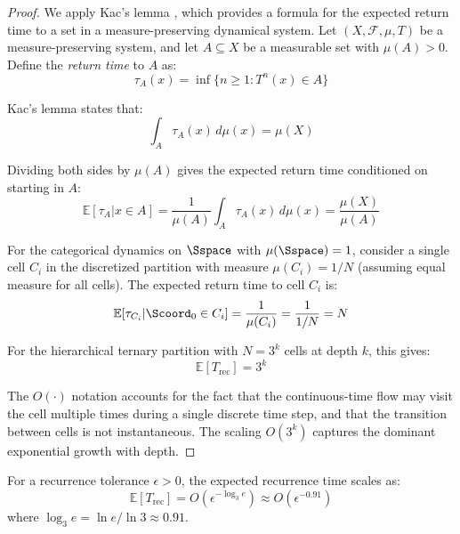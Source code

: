 \begin{proof}
We apply Kac's lemma \citep{kac1947notion}, which provides a formula for the expected return time to a set in a measure-preserving dynamical system. Let $(X, \mathcal{F}, \mu, T)$ be a measure-preserving system, and let $A \subseteq X$ be a measurable set with $\mu(A) > 0$. Define the \textit{return time} to $A$ as:
\begin{equation}
\tau_A(x) = \inf\{n \geq 1 : T^n(x) \in A\}
\end{equation}

Kac's lemma states that:
\begin{equation}
\int_A \tau_A(x) \, d\mu(x) = \mu(X)
\label{eq:kac_lemma}
\end{equation}

Dividing both sides by $\mu(A)$ gives the expected return time conditioned on starting in $A$:
\begin{equation}
\mathbb{E}[\tau_A | x \in A] = \frac{1}{\mu(A)} \int_A \tau_A(x) \, d\mu(x) = \frac{\mu(X)}{\mu(A)}
\label{eq:expected_return}
\end{equation}

For the categorical dynamics on $\Sspace$ with $\mu(\Sspace) = 1$, consider a single cell $C_i$ in the discretized partition with measure $\mu(C_i) = 1/N$ (assuming equal measure for all cells). The expected return time to cell $C_i$ is:
\begin{equation}
\mathbb{E}[\tau_{C_i} | \Scoord_0 \in C_i] = \frac{1}{\mu(C_i)} = \frac{1}{1/N} = N
\end{equation}

For the hierarchical ternary partition with $N = 3^k$ cells at depth $k$, this gives:
\begin{equation}
\mathbb{E}[T_{\text{rec}}] = 3^k
\end{equation}

The $O(\cdot)$ notation accounts for the fact that the continuous-time flow may visit the cell multiple times during a single discrete time step, and that the transition between cells is not instantaneous. The scaling $O(3^k)$ captures the dominant exponential growth with depth.
\end{proof}

\begin{corollary}
\label{cor:resolution_time}
For a recurrence tolerance $\epsilon > 0$, the expected recurrence time scales as:
\begin{equation}
\mathbb{E}[T_{\text{rec}}] = O\left( \epsilon^{-\log_3 e} \right) \approx O\left( \epsilon^{-0.91} \right)
\label{eq:resolution_time_scaling}
\end{equation}
where $\log_3 e = \ln e / \ln 3 \approx 0.91$.
\end{corollary}

